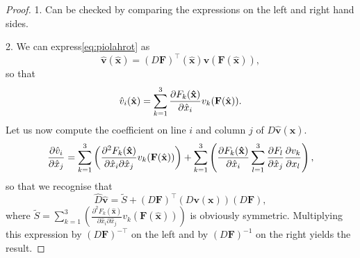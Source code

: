 \begin{proof}
1. Can be checked by comparing the expressions on the left and right hand sides.

2.  We can express\eqref{eq:piolahrot} as
$$ \hat{\mathbf{v}}( \hat{\mathbf{x}}) = (D\mathbf{F})^\top( \hat{\mathbf{x}}) \mathbf{v}( \mathbf{F}( \hat{\mathbf{x}})),$$
so that 
$$  \hat{v}_i( \hat{\mathbf{x}}) = \sum_{k=1}^3 \frac{\partial F_k (\mathbf{\hat{x}})}{\partial \hat{x}_i} v_k ( \mathbf{F}( \hat{\mathbf{x}})).$$
Let us now compute the coefficient on line $i$ and column $j$ of $ D \hat{\mathbf{v}}( \hat{\mathbf{x}}).$
$$
\frac{\partial  \hat{v}_i}{\partial  \hat{x}_j} = \sum_{k=1}^3 \left(\frac{\partial^2 F_k (\mathbf{\hat{x}})}{\partial\hat{x}_i\partial\hat{x}_j}
v_k ( \mathbf{F}( \hat{\mathbf{x}})) \right) 
+   \sum_{k=1}^3 \left(\frac{\partial F_k (\mathbf{\hat{x}})}{\partial \hat{x}_i} \sum_{l=1}^3 \frac{\partial  F_l}{\partial  \hat{x}_j}\frac{\partial  v_k}{\partial x_l} \right),
$$
so that we recognise that
$$ \hat{D} \hat{\mathbf{v}} = \tilde{S} + (D \mathbf{F})^\top (D \mathbf{v}( \mathbf{x})) (D \mathbf{F}),$$
 where $\tilde{S} = \sum_{k=1}^3 \left(\frac{\partial^2 F_k (\mathbf{\hat{x}})}{\partial\hat{x}_i\partial\hat{x}_j}
v_k ( \mathbf{F}( \hat{\mathbf{x}})) \right) $ is obviously symmetric. Multiplying this expression by
$ (D \mathbf{F})^{-\top}$ on the left and by $ (D \mathbf{F})^{-1}$ on the right yields the result. 


\end{proof}
